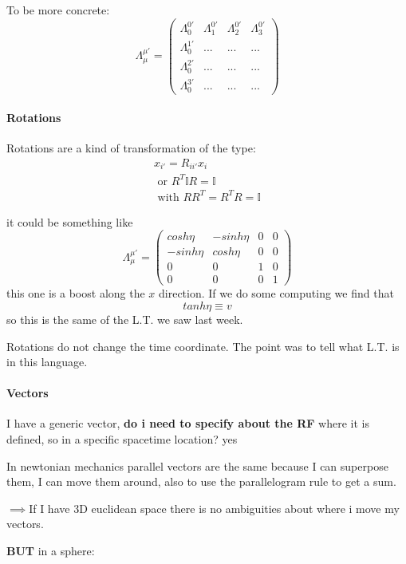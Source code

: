 \documentclass{report}
\begin{document}
To be more concrete:
\begin{equation}
\Lambda^{\mu'}_{\mu } = \begin{pmatrix}
\Lambda^{0'}_{0} & \Lambda^{0'}_{1} & \Lambda^{0'}_{2} & \Lambda^{0'}_{3} \\
\Lambda^{1'}_{0} & ... & ... & ... \\
\Lambda^{2'}_{0} & ... & ... & ... \\
\Lambda^{3'}_{0} & ... & ... & ...
\end{pmatrix} 
\end{equation}

\paragraph{Rotations} 


Rotations are a kind of transformation of the type:
\begin{gather*}
x_{i'} = R_{i i'} x_{i} \\
\text{ or } R^{T} \mathbb{I} R = \mathbb{I} \\
\text{ with } RR^{T} = R^{T}R = \mathbb{I}
\end{gather*}

it could be something like
\begin{equation} \Lambda^{\mu'}_{\mu } = 
\begin{pmatrix}
cosh \eta  & -sinh \eta   & 0 & 0 \\
-sinh \eta  & cosh \eta  & 0 & 0 \\
0 & 0 & 1 & 0 \\
0 & 0 & 0 & 1
\end{pmatrix} 
\end{equation}
this one is a boost along the $x$ direction. If we do some computing we find that 
\[
tanh \eta \equiv v
\]
so this is the same of the L.T. we saw last week. \par

Rotations do not change the time coordinate. The point was to tell what L.T. is in this language.

\paragraph{Vectors}


I have a generic vector, \textbf{do i need to  specify about the RF} where it is defined, so in a specific spacetime location? {\tiny yes} \par

In newtonian mechanics parallel vectors are the same because I can superpose them, I can move them around, also to use the parallelogram rule to get a sum. \par
$\implies$If I have 3D euclidean space there is no ambiguities about where i move my vectors.\par
\textbf{BUT} in a sphere:
\end{document}
